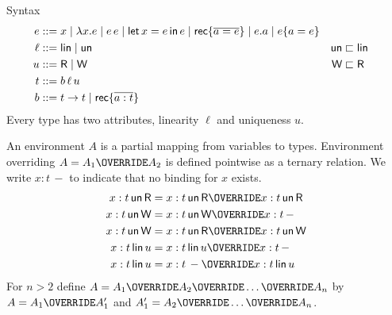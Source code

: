 \documentclass{llncs}
\begin{document}
Syntax
\begin{align*}
  e &::= x \mid \lambda x.e \mid e\,e \mid \textsf{let}\,x=e\,\textsf{in}\,e \mid \textsf{rec}\{ \overline{a=e}\} \mid e.a \mid e\{a=e\} \\
  \ell &::= \textsf{lin} \mid \textsf{un} & \textsf{un} & \sqsubset \textsf{lin} \\
  u &::= \textsf{R} \mid \textsf{W} & \textsf{W} & \sqsubset \textsf{R} \\
  t &::= b\,\ell\, u \\
  b &::= t \to t \mid \textsf{rec}\{ \overline{a : t}\}
\end{align*}
Every type has two attributes, linearity $\ell$ and uniqueness $u$.

An environment $A$ is a partial mapping from variables to types. Environment overriding $A=A_1\OVERRIDE A_2$ is defined pointwise as a ternary  relation. We write $x:t\,-$ to indicate that no binding for $x$ exists. 
\begin{align*}
  x : t\,\UN\,\READ & =  x:t\,\UN\,\READ  \OVERRIDE x:t\,\UN\,\READ \\
  x : t\,\UN\,\WRITE & =  x:t\,\UN\,\WRITE  \OVERRIDE x:t\,- \\
  x : t\,\UN\,\WRITE & =  x:t\,\UN\,\READ  \OVERRIDE x:t\, \UN\,\WRITE \\
  x : t\,\LIN\,u & =  x:t\,\LIN\,u  \OVERRIDE x:t\,- \\
  x : t\,\LIN\,u & =  x:t\,-  \OVERRIDE x:t\, \LIN\,u \\
\end{align*}
For $n>2$ define $A= A_1 \OVERRIDE A_2 \OVERRIDE \dots \OVERRIDE A_n$ by $A= A_1 \OVERRIDE A_1'$ and $A_1' = A_2 \OVERRIDE \dots \OVERRIDE A_n$. 
\end{document}
